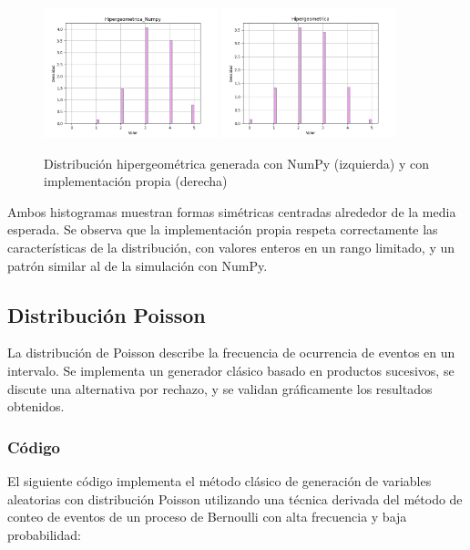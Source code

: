 \documentclass{article}
\begin{document}
\begin{figure}[H]
    \centering
    \includegraphics[width=0.45\textwidth]{Imagenes/Distribucion_Hipergeometrica_Numpy.png}
    \includegraphics[width=0.45\textwidth]{Imagenes/Distribucion_Hipergeometrica.png}
    \caption{Distribución hipergeométrica generada con NumPy (izquierda) y con implementación propia (derecha)}
    \label{fig:hipergeometrica}
\end{figure}

Ambos histogramas muestran formas simétricas centradas alrededor de la media esperada. Se observa que la implementación propia respeta correctamente las características de la distribución, con valores enteros en un rango limitado, y un patrón similar al de la simulación con NumPy.




\subsection{Distribución Poisson}
La distribución de Poisson describe la frecuencia de ocurrencia de eventos en un intervalo. Se implementa un generador clásico basado en productos sucesivos, se discute una alternativa por rechazo, y se validan gráficamente los resultados obtenidos.

\subsubsection{Código}
El siguiente código implementa el método clásico de generación de variables aleatorias con distribución Poisson utilizando una técnica derivada del método de conteo de eventos de un proceso de Bernoulli con alta frecuencia y baja probabilidad:
\end{document}
